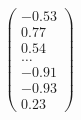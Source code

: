 \documentclass[preview]{standalone}
\begin{document}
\begin{align*}
\begin{pmatrix} -0.53 \\ 0.77 \\ 0.54 \\ \dots \\ -0.91 \\ -0.93 \\ 0.23 \end{pmatrix}
\end{align*}
\end{document}
